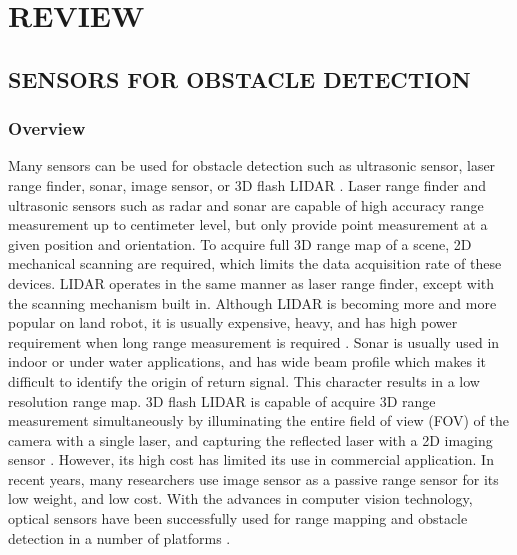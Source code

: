 \chapter{REVIEW}\label{ch:Review}

\section{SENSORS FOR OBSTACLE DETECTION}\label{sec:sensor}

\subsection{Overview}\label{sec:SensorOverview}
Many sensors can be used for obstacle detection such as ultrasonic
sensor, laser range finder, sonar, image sensor, or 3D flash LIDAR
\cite{de_angelis_low-cost_2007} \cite{alonge_novel_2009}
\cite{harb_neural_2008} \cite{saad_robust_2011}
\cite{williams_efficient_2001} \cite{chong_feature-based_1999}
\cite{hanna_obstacle_2008} \cite{lu_distance_2010}
\cite{civera_inverse_2008} \cite{jirawimut_visual_2003}
\cite{amzajerdian_lidar_2011}. Laser range finder and ultrasonic
sensors such as radar and sonar are capable of high accuracy range
measurement up to centimeter level, but only provide point
measurement at a given position and orientation. To acquire full 3D
range map of a scene, 2D mechanical scanning are required, which
limits the data acquisition rate of these devices. LIDAR operates in
the same manner as laser range finder, except with the scanning
mechanism built in. Although LIDAR is becoming more and more popular
on land robot, it is usually expensive, heavy,
\cite{subharsanan_low_2013} and has high power requirement when long
range measurement is required \cite{lemmens_airborne_2007}. Sonar is
usually used in indoor or under water applications, and has wide beam
profile which makes it difficult to identify the origin of return
signal. This character results in a low resolution range map. 3D flash
LIDAR is capable of acquire 3D range measurement simultaneously by
illuminating the entire field of view (FOV) of the camera with a
single laser, and capturing the reflected laser with a 2D imaging
sensor \cite{amzajerdian_lidar_2011}. However, its high cost has
limited its use in commercial application. In recent years, many
researchers use image sensor as a passive range sensor for its low
weight, and low cost. With the advances in computer vision technology,
optical sensors have been successfully used for range mapping and
obstacle detection in a number of platforms \cite{einhorn_cant_2010}
\cite{hashimoto_detection_1996} \cite{yamaguchi_moving_2006}
\cite{zhang_obstacle_2012} \cite{maier_self-supervised_2011}
\cite{kubota_global_2007} \cite{xu_method_2009}
\cite{hanna_obstacle_2008} \cite{zhang_real-time_2012}
\cite{van_der_mark_stereo_2007} \cite{broggi_stereo_2011}.

